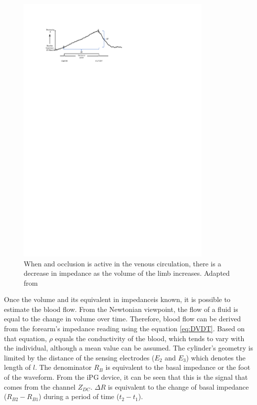 \begin{figure}[!htpb]
	\centering
	\includegraphics[width=0.85\textwidth,keepaspectratio]{figure_Z_change}
	\caption[Change of baseline impedance during a venous occlusion]{When and occlusion is active in the venous circulation, there is a decrease in impedance as the volume of the limb increases. Adapted from \cite{golden1986assessment}}
	\label{fig:impedance decrease}
\end{figure}

Once the volume and its equivalent in impedanceis known, it is possible to estimate the blood flow. From the Newtonian viewpoint, the flow of a fluid is equal to the change in volume over time. Therefore, blood flow can be derived from the forearm's impedance reading using the equation \ref{eq:DVDT}. Based on that equation, $\rho$ equals the conductivity of the blood, which tends to vary with the individual, although a mean value can be assumed. The cylinder's geometry is limited by the distance of the sensing electrodes ($E_2$ and $E_3$) which denotes the length of $l$. The denominator $R_B$ is equivalent to the basal impedance or the foot of the waveform. From the iPG device, it can be seen that this is the signal that comes from the channel $Z_{DC}$. $\Delta R$ is equivalent to the change of basal impedance ($R_{B2} - R_{B1}$) during a period of time ($t_2 - t_1$).  

